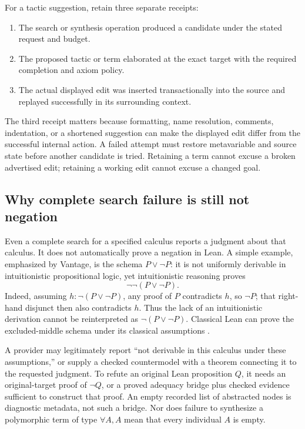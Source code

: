 \documentclass[11pt,letterpaper]{article}
\begin{document}
For a tactic suggestion, retain three separate receipts:
\begin{enumerate}
\item The search or synthesis operation produced a candidate under the stated
request and budget.
\item The proposed tactic or term elaborated at the exact target with the
required completion and axiom policy.
\item The actual displayed edit was inserted transactionally into the source
and replayed successfully in its surrounding context.
\end{enumerate}
The third receipt matters because formatting, name resolution, comments,
indentation, or a shortened suggestion can make the displayed edit differ from
the successful internal action. A failed attempt must restore metavariable and
source state before another candidate is tried. Retaining a term cannot excuse
a broken advertised edit; retaining a working edit cannot excuse a changed goal.

\subsection{Why complete search failure is still not negation}
Even a complete search for a specified calculus reports a judgment about that
calculus. It does not automatically prove a negation in Lean. A simple example,
emphasized by Vantage, is the schema \(P\lor\neg P\): it is not uniformly
derivable in intuitionistic propositional logic, yet intuitionistic reasoning
proves
\[
 \neg\neg(P\lor\neg P).
\]
Indeed, assuming \(h:\neg(P\lor\neg P)\), any proof of \(P\) contradicts
\(h\), so \(\neg P\); that right-hand disjunct then also contradicts \(h\).
Thus the lack of an intuitionistic derivation cannot be reinterpreted as
\(\neg(P\lor\neg P)\). Classical Lean can prove the excluded-middle schema
under its classical assumptions \cite[\S5.7]{vantage}.

A provider may legitimately report ``not derivable in this calculus under these
assumptions,'' or supply a checked countermodel with a theorem connecting it to
the requested judgment. To refute an original Lean proposition \(Q\), it needs
an original-target proof of \(\neg Q\), or a proved adequacy bridge plus checked
evidence sufficient to construct that proof. An empty recorded list of abstracted
nodes is diagnostic metadata, not such a bridge. Nor does failure to synthesize a polymorphic
term of type \(\forall A, A\) mean that every individual \(A\) is empty.
\end{document}
